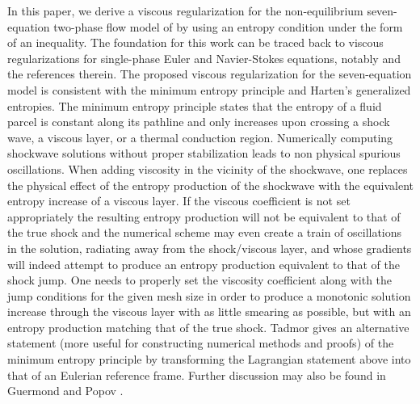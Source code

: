 In this paper, we derive a viscous regularization for the non-equilibrium seven-equation two-phase flow model of \cite{SEM} by using an entropy condition under 
the form of an inequality. 
The foundation for this work can be traced back to viscous regularizations for single-phase Euler and Navier-Stokes equations, notably \cite{jlg_VR_SIAM_2004} and the references therein. 
The proposed viscous regularization for the seven-equation model is consistent with the minimum entropy principle and Harten's generalized entropies. 
The minimum entropy principle states that the entropy of a fluid parcel is constant along its pathline
and only increases upon crossing a shock wave, a viscous layer, or a thermal conduction region.  Numerically computing 
shockwave solutions without proper stabilization leads to non physical spurious oscillations. When adding viscosity in the vicinity 
of the shockwave, one replaces the physical effect of the entropy production of the shockwave with the equivalent entropy increase of a viscous layer.  
If the viscous coefficient is not set appropriately 
the resulting entropy production will not be equivalent to that of the true shock and the numerical scheme %
may even create a train of oscillations in the solution, radiating away from the shock/viscous layer, and whose gradients will indeed 
attempt to produce an entropy production equivalent to that of the shock jump. One needs to properly set the viscosity coefficient along with the 
jump conditions for the given mesh size in order to produce a monotonic solution increase through the viscous layer with as little smearing as possible, 
but with an entropy production matching that of the true shock.
Tadmor \cite{tadmor_minimum_entropy_principle} gives an alternative statement (more useful for constructing numerical methods and proofs) of the minimum 
entropy principle by transforming the Lagrangian statement above into that of an Eulerian reference frame. Further discussion may also be found in 
Guermond and Popov \cite{jlg_VR_SIAM_2004}.

